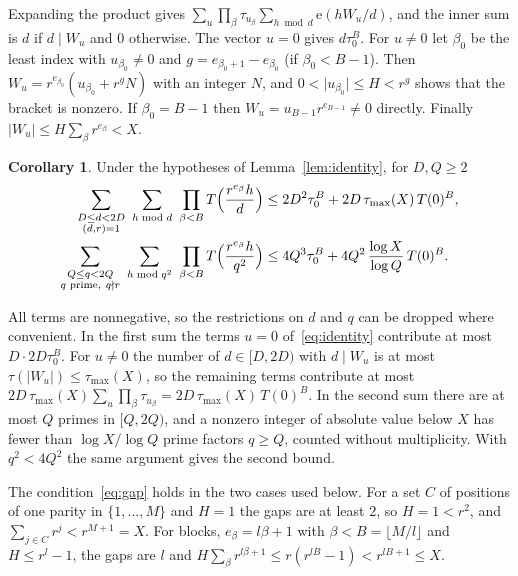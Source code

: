 \documentclass[11pt]{amsart}
\makeatletter
\theoremstyle{definition}
\newtheorem{corollary}[theorem]{Corollary}
\numberwithin{equation}{section}
\renewenvironment{proof}[1][\proofname]{\par\pushQED{\qed}\normalfont\topsep6\p@\@plus6\p@\relax\trivlist\item[\hskip\labelsep\upshape#1.]\ignorespaces}{\popQED\endtrivlist\@endpefalse}
\newcommand{\e}{\mathrm{e}}
\newcommand{\tmax}{\tau_{\max}}
\makeatother
\begin{document}
\begin{proof}
Expanding the product gives $\sum_u\prod_\beta\tau_{u_\beta}\sum_{h\bmod d}\e(hW_u/d)$, and the inner sum is $d$ if $d\mid W_u$ and $0$ otherwise. The vector $u=0$ gives $d\tau_0^B$. For $u\ne0$ let $\beta_0$ be the least index with $u_{\beta_0}\ne0$ and $g=e_{\beta_0+1}-e_{\beta_0}$ (if $\beta_0<B-1$). Then $W_u=r^{e_{\beta_0}}(u_{\beta_0}+r^gN)$ with an integer $N$, and $0<\lvert u_{\beta_0}\rvert\le H<r^g$ shows that the bracket is nonzero. If $\beta_0=B-1$ then $W_u=u_{B-1}r^{e_{B-1}}\ne0$ directly. Finally $\lvert W_u\rvert\le H\sum_\beta r^{e_\beta}<X$.
\end{proof}

\begin{corollary}\label{cor:identity}
Under the hypotheses of Lemma~\ref{lem:identity}, for $D,Q\ge2$
\begin{align*}
\sum_{\substack{D\le d<2D\\(d,r)=1}}\ \sum_{h\bmod d}\ \prod_{\beta<B}T\Bigl(\frac{r^{e_\beta}h}{d}\Bigr)&\le2D^2\tau_0^B+2D\,\tmax(X)\,T(0)^B,\\
\sum_{\substack{Q\le q<2Q\\q\text{ prime},\ q\nmid r}}\ \sum_{h\bmod q^2}\ \prod_{\beta<B}T\Bigl(\frac{r^{e_\beta}h}{q^2}\Bigr)&\le4Q^3\tau_0^B+4Q^2\,\frac{\log X}{\log Q}\,T(0)^B.
\end{align*}
\end{corollary}

\begin{proof}
All terms are nonnegative, so the restrictions on $d$ and $q$ can be dropped where convenient. In the first sum the terms $u=0$ of~\eqref{eq:identity} contribute at most $D\cdot2D\tau_0^B$. For $u\ne0$ the number of $d\in[D,2D)$ with $d\mid W_u$ is at most $\tau(\lvert W_u\rvert)\le\tmax(X)$, so the remaining terms contribute at most $2D\,\tmax(X)\sum_u\prod_\beta\tau_{u_\beta}=2D\,\tmax(X)\,T(0)^B$. In the second sum there are at most $Q$ primes in $[Q,2Q)$, and a nonzero integer of absolute value below $X$ has fewer than $\log X/\log Q$ prime factors $q\ge Q$, counted without multiplicity. With $q^2<4Q^2$ the same argument gives the second bound.
\end{proof}

The condition~\eqref{eq:gap} holds in the two cases used below. For a set $C$ of positions of one parity in $\{1,\dots,M\}$ and $H=1$ the gaps are at least $2$, so $H=1<r^2$, and $\sum_{j\in C}r^j<r^{M+1}=X$. For blocks, $e_\beta=l\beta+1$ with $\beta<B=\lfloor M/l\rfloor$ and $H\le r^l-1$, the gaps are $l$ and $H\sum_\beta r^{l\beta+1}\le r(r^{lB}-1)<r^{lB+1}\le X$.
\end{document}
